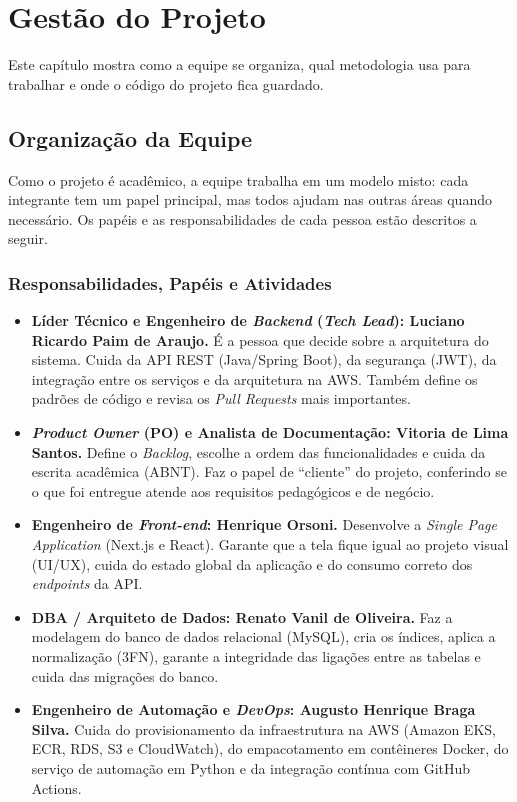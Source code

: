 \chapter{Gestão do Projeto}

Este capítulo mostra como a equipe se organiza, qual metodologia usa para trabalhar e onde o código do projeto fica guardado.

\section{Organização da Equipe}

Como o projeto é acadêmico, a equipe trabalha em um modelo misto: cada integrante tem um papel principal, mas todos ajudam nas outras áreas quando necessário. Os papéis e as responsabilidades de cada pessoa estão descritos a seguir.

\subsection{Responsabilidades, Papéis e Atividades}

\begin{itemize}
    \item \textbf{Líder Técnico e Engenheiro de \textit{Backend} (\textit{Tech Lead}): Luciano Ricardo Paim de Araujo.} É a pessoa que decide sobre a arquitetura do sistema. Cuida da API REST (Java/Spring Boot), da segurança (JWT), da integração entre os serviços e da arquitetura na AWS. Também define os padrões de código e revisa os \textit{Pull Requests} mais importantes.

    \item \textbf{\textit{Product Owner} (PO) e Analista de Documentação: Vitoria de Lima Santos.} Define o \textit{Backlog}, escolhe a ordem das funcionalidades e cuida da escrita acadêmica (ABNT). Faz o papel de ``cliente'' do projeto, conferindo se o que foi entregue atende aos requisitos pedagógicos e de negócio.

    \item \textbf{Engenheiro de \textit{Front-end}: Henrique Orsoni.} Desenvolve a \textit{Single Page Application} (Next.js e React). Garante que a tela fique igual ao projeto visual (UI/UX), cuida do estado global da aplicação e do consumo correto dos \textit{endpoints} da API.

    \item \textbf{DBA / Arquiteto de Dados: Renato Vanil de Oliveira.} Faz a modelagem do banco de dados relacional (MySQL), cria os índices, aplica a normalização (3FN), garante a integridade das ligações entre as tabelas e cuida das migrações do banco.

    \item \textbf{Engenheiro de Automação e \textit{DevOps}: Augusto Henrique Braga Silva.} Cuida do provisionamento da infraestrutura na AWS (Amazon EKS, ECR, RDS, S3 e CloudWatch), do empacotamento em contêineres Docker, do serviço de automação em Python e da integração contínua com GitHub Actions.
\end{itemize}

